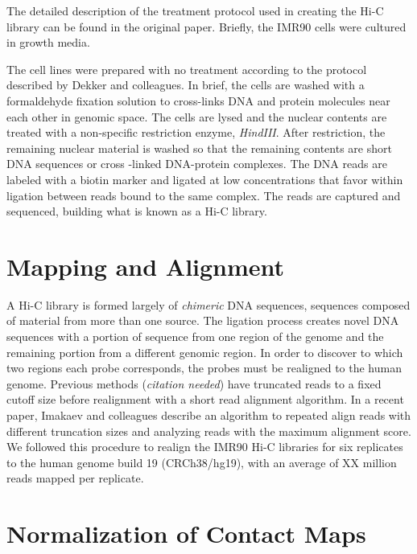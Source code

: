 \documentclass[phd,tocprelim]{cornell}
\begin{document}
The detailed description of the treatment protocol used in creating the Hi-C
library can be found in the original paper\cite{ren2013}.  Briefly, the IMR90
cells were cultured in growth media.

The cell lines were prepared with no treatment according to the protocol
described by Dekker and colleagues\cite{dekker2013}.  In brief, the cells
are washed with a formaldehyde fixation solution to cross-links DNA and
protein molecules near each other in genomic space.  The cells are
lysed and the nuclear contents are treated with a non-specific restriction
enzyme, \textit{HindIII}.  After restriction, the remaining nuclear material
is washed so that the remaining contents are short DNA sequences or cross
-linked DNA-protein complexes.  The DNA reads are labeled with a biotin
marker and ligated at low concentrations that favor within ligation between
reads bound to the same complex.  The reads are captured and sequenced,
building what is known as a Hi-C library.





\section{Mapping and Alignment}

A Hi-C library is formed largely of \textit{chimeric} DNA sequences,
sequences composed of material from more than one source.  The ligation process
creates novel DNA sequences with a portion of sequence from one region of
the genome and the remaining portion from a different genomic region.  In
order to discover to which two regions each probe corresponds, the probes
must be realigned to the human genome.  Previous methods (\textit{citation needed})
have truncated reads to a fixed cutoff size before realignment with a short
read alignment algorithm.  In a recent paper, Imakaev and colleagues
describe an algorithm to repeated align reads with different truncation sizes
and analyzing reads with the maximum alignment score\cite{imakaev2012}.  We followed
this procedure to realign the IMR90 Hi-C libraries for six replicates to
the human genome build 19 (CRCh38/hg19), with an average of XX million reads
mapped per replicate.

\section{Normalization of Contact Maps}
\end{document}
